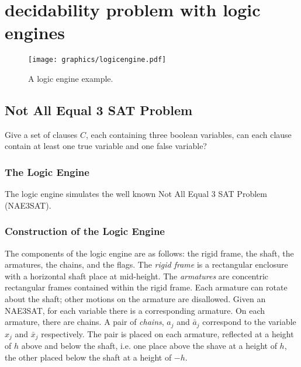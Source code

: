 \chapter{decidability problem with logic engines}
\begin{figure}[!htbp]
\begin{center}
\texttt{[image: graphics/logicengine.pdf]}
\caption{A logic engine example.}\label{fig:logicengine-1}
\end{center}
\end{figure}
\section{Not All Equal 3 SAT Problem}
\begin{prob}\label{prob:Satisfiability-2}%
Give a set of clauses $C$, each containing three boolean variables, can each clause contain at
least one true variable and one false variable?
\end{prob}
\subsection{The Logic Engine}
The logic engine simulates the well known Not All Equal 3 SAT Problem (NAE3SAT).
\subsection{Construction of the Logic Engine}
The components of the logic engine are as follows: the rigid frame, the shaft, the armatures,
the chains, and the flags.  The \textit{rigid frame} is a rectangular enclosure with a horizontal
shaft place at mid-height.  The \textit{armatures} are concentric rectangular frames contained
within the rigid frame.  Each armature can rotate about the shaft; other motions on the armature
are disallowed.  Given an NAE3SAT, for each variable there is a corresponding armature. On each
armature, there are chains.  A pair of \textit{chains}, $a_j$ and $\bar{a}_j$ correspond to the
variable $x_j$ and $\bar{x}_j$ respectively.  The pair is placed on each armature, reflected at a
height of $h$ above and below the shaft, i.e. one place above the shave at a height of $h$, the
other placed below the shaft at a height of $-h$.


